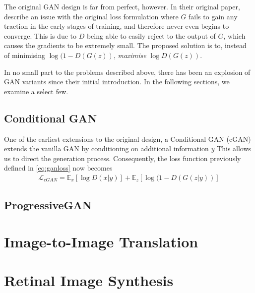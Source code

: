 The original GAN design is far from perfect, however. In their original paper, \citeauthor{NIPS2014_5ca3e9b1} describe an issue with the original loss formulation where $G$ fails to gain any traction in the early stages of training, and therefore never even begins to converge. This is due to $D$ being able to easily reject to the output of $G$, which causes the gradients to be extremely small. The proposed solution is to, instead of minimising $\log(1-D(G(z))$, \emph{maximise} $\log D(G(z))$.

In no small part to the problems described above, there has been an explosion of GAN variants since their initial introduction. In the following sections, we examine a select few.

\subsection{Conditional GAN}

One of the earliest extensions to the original design, a Conditional GAN (cGAN) extends the vanilla GAN by conditioning on additional information $y$ \cite{mirza2014conditional} This allows us to direct the generation process. Consequently, the loss function previously defined in \autoref{eq:ganloss} now becomes
\begin{align}
    \mathcal{L}_{cGAN} = \mathbb{E}_x[\log D(x|y)] + \mathbb{E}_z[\log (1-D(G(z|y))]
\end{align}

\subsection{ProgressiveGAN}



\section{Image-to-Image Translation}

\section{Retinal Image Synthesis}


